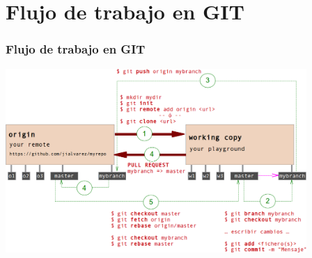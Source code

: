 \section{Flujo de trabajo en GIT}
\frame
{
\frametitle{Flujo de trabajo en GIT}
\begin{center}
 \includegraphics[height=7cm]{imgs/gitworkflow.png}
\end{center}
}
